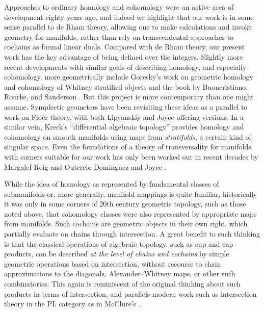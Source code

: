 Approaches to ordinary homology and cohomology were an active area of development eighty years ago, and indeed we highlight that our work is in some sense parallel to de Rham theory, allowing one to make calculations and invoke geometry for manifolds, rather than rely on transcendental approaches to cochains as formal linear duals.
Compared with de Rham theory, our present work has the key advantage of being defined over the integers.
Slightly more recent developments with similar goals of describing homology, and especially cohomology, more geometrically include Goresky's work on geometric homology and cohomology of Whitney stratified objects \cite{goresky1981stratified} and the book by Buoncristiano, Rourke, and Sanderson \cite{buoncristiano1976homology}.
But this project is more contemporary than one might assume.
Symplectic geometers have been revisiting these ideas as a parallel to work on Floer theory, with both Lipyanskiy \cite{Lipy14} and Joyce \cite{Joyc15} offering versions.
In a similar vein, Kreck's ``differential algebraic topology'' \cite{Krec10} provides homology and cohomology on smooth manifolds using maps from \textit{stratifolds}, a certain kind of singular space.
Even the foundations of a theory of transversality for manifolds with corners suitable for our work has only been worked out in recent decades by Margalef-Roig and Outerelo Dominguez \cite{MaDo92} and Joyce \cite{Joy12}.

While the idea of homology as represented by fundamental classes of submanifolds or, more generally, manifold mappings is quite familiar, historically it was only in some corners of 20th century geometric topology, such as those noted above, that \textit{co}homology classes were also represented by appropriate maps from manifolds.
Such cochains are geometric objects in their own right, which partially evaluate on chains through intersection.
A great benefit to such thinking is that the classical operations of algebraic topology, such as cup and cap products, can be described \textit{at the level of chains and cochains} by simple geometric operations based on intersection, without recourse to chain approximations to the diagonals, Alexander--Whitney maps, or other such combinatorics.
This again is reminiscent of the original thinking about such products in terms of intersection, and parallels modern work such as intersection theory in the PL category as in McClure's \cite{McC06}.


